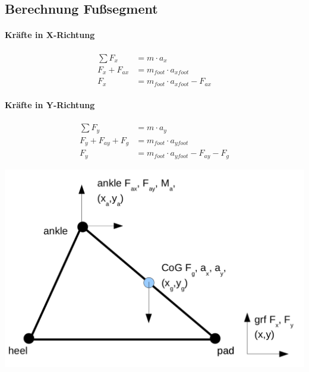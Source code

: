\subsection*{Berechnung Fußsegment}
\begin{minipage}{.5\linewidth}
\paragraph{Kräfte in X-Richtung}
\begin{equation*}
\begin{split}
\sum F_x &= m \cdot a_x\\
F_x + F_{ax} &= m_{foot} \cdot a_{x foot}\\
F_x &= m_{foot} \cdot a_{x foot} - F_{ax} 
\end{split}
\end{equation*}

\paragraph{Kräfte in Y-Richtung}
\begin{equation*}
\begin{split}
\sum F_y &= m \cdot a_y\\
F_y + F_{ay} + F_g &= m_{foot} \cdot a_{y foot}\\
F_y &= m_{foot} \cdot a_{y foot} -  F_{ay} - F_g
\end{split}
\end{equation*}
\end{minipage}%
\begin{minipage}{.5\linewidth}
	\centering
	\includegraphics[width=\linewidth]{bilder/anhang/foot_segment}
	\label{fig:foot_segment}
\end{minipage}

